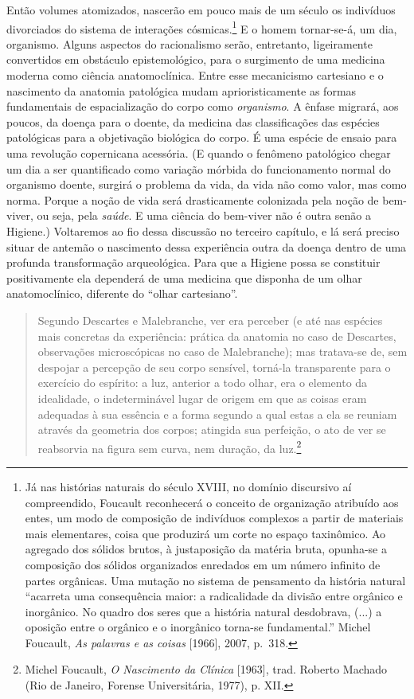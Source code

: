 Então volumes atomizados, nascerão em pouco mais de um século os
indivíduos divorciados do sistema de interações cósmicas.\footnote{Já
  nas histórias naturais do século XVIII, no domínio discursivo aí
  compreendido, Foucault reconhecerá o conceito de organização atribuído
  aos entes, um modo de composição de indivíduos complexos a partir de
  materiais mais elementares, coisa que produzirá um corte no espaço
  taxinômico. Ao agregado dos sólidos brutos, à justaposição da matéria
  bruta, opunha-se a composição dos sólidos organizados enredados em um
  número infinito de partes orgânicas. Uma mutação no sistema de
  pensamento da história natural ``acarreta uma consequência maior: a
  radicalidade da divisão entre orgânico e inorgânico. No quadro dos
  seres que a história natural desdobrava, (...) a oposição entre o
  orgânico e o inorgânico torna-se fundamental.'' Michel Foucault,
  \emph{As palavras e as coisas} {[}1966{]}, 2007, p.~318.} E o homem
tornar-se-á, um dia, organismo. Alguns aspectos do racionalismo serão,
entretanto, ligeiramente convertidos em obstáculo epistemológico, para o
surgimento de uma medicina moderna como ciência anatomoclínica. Entre
esse mecanicismo cartesiano e o nascimento da anatomia patológica mudam
aprioristicamente as formas fundamentais de espacialização do corpo como
\emph{organismo}. A ênfase migrará, aos poucos, da doença para o doente,
da medicina das classificações das espécies patológicas para a
objetivação biológica do corpo. É uma espécie de ensaio para uma
revolução copernicana acessória. (E quando o fenômeno patológico chegar
um dia a ser quantificado como variação mórbida do funcionamento normal
do organismo doente, surgirá o problema da vida, da vida não como valor,
mas como norma. Porque a noção de vida será drasticamente colonizada
pela noção de bem-viver, ou seja, pela \emph{saúde}. E uma ciência do
bem-viver não é outra senão a Higiene.) Voltaremos ao fio dessa
discussão no terceiro capítulo, e lá será preciso situar de antemão o
nascimento dessa experiência outra da doença dentro de uma profunda
transformação arqueológica. Para que a Higiene possa se constituir
positivamente ela dependerá de uma medicina que disponha de um olhar
anatomoclínico, diferente do ``olhar cartesiano''.

\begin{quote}
Segundo Descartes e Malebranche, ver era perceber (e até nas espécies
mais concretas da experiência: prática da anatomia no caso de Descartes,
observações microscópicas no caso de Malebranche); mas tratava-se de,
sem despojar a percepção de seu corpo sensível, torná-la transparente
para o exercício do espírito: a luz, anterior a todo olhar, era o
elemento da idealidade, o indeterminável lugar de origem em que as
coisas eram adequadas à sua essência e a forma segundo a qual estas a
ela se reuniam através da geometria dos corpos; atingida sua perfeição,
o ato de ver se reabsorvia na figura sem curva, nem duração, da
luz.\footnote{Michel Foucault, \emph{O Nascimento da Clínica}
  {[}1963{]}, trad. Roberto Machado (Rio de Janeiro, Forense
  Universitária, 1977), p. XII.}
\end{quote}

